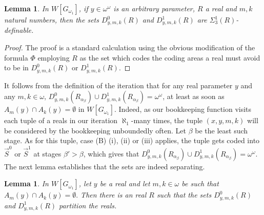 \documentclass[a4paper,11pt]{article}
\newtheorem{lemma}[theorem]{Lemma}
\begin{document}
\begin{lemma}
In $W[G_{\omega_1}]$, if $y \in \omega^{\omega}$ is an arbitrary  parameter, $R$ a real and $m,k$ natural numbers, then the sets $D^0_{y,m,k}(R)$ and $D^1_{y,m,k}(R)$ are $\Sigma^1_3(R)$-definable.
\end{lemma}
\begin{proof}
The proof is a standard calculation using the obvious modification of the formula $\Phi$ employing $R$ as the set which codes the coding areas a real must avoid to be in $D^0_{y,m,k} (R)$ or $D^1_{y,m,k}(R)$.
\end{proof}
It follows  from the definition of the iteration that for any  real parameter $y$ and any $m,k \in \omega$, $D^0_{y,m,k} (R_{\alpha_{\beta}})  \cup D^1_{y,m,k} (R_{\alpha_{\beta}}) = \omega^{\omega}$, at least as soon as $A_m(y) \cap A_k(y) =\emptyset$ in $W[G_{\omega_1}]$. Indeed, as our bookkeeping function visits each tuple of a reals in our iteration $\aleph_1$-many times, the tuple $(x,y,m,k)$  will be considered by the bookkeeping unboundedly often. Let $\beta$ be the least such stage. As for this tuple, case (B) (i), (ii) or (iii) applies, the tuple gets coded into $\vec{S}^0$ or $\vec{S}^1$ at stages $\beta' > \beta$, which gives that $D^0_{y,m,k} (R_{\alpha_{\beta}})  \cup D^1_{y,m,k} (R_{\alpha_{\beta}}) = \omega^{\omega}$.
The next lemma establishes that the sets are indeed separating.
\begin{lemma}
In $W[G_{\omega_1}]$, let $y$ be a real and let $m,k \in \omega$ be such that $A_m(y) \cap A_k(y)=\emptyset.$ Then there is an real $R$ such that the sets  $D^0_{y,m,k}(R)$ and $ D^1_{y,m,k}(R)$ partition the reals. 
\end{lemma}
\end{document}

